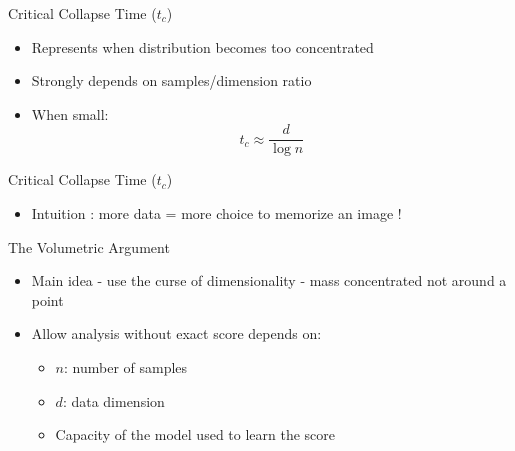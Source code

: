 \documentclass[aspectratio=169]{beamer}
\begin{document}
\begin{frame}{Critical Collapse Time ($t_c$)}
    \begin{itemize}

        \item Represents when distribution becomes too concentrated
        \item Strongly depends on samples/dimension ratio
        \item When small:
        \begin{equation}
            t_c \approx \frac{d}{\log n}
        \end{equation}
    \end{itemize}
    
    \begin{center}
    \end{center}
\end{frame}



\begin{frame}{Critical Collapse Time ($t_c$)}
\begin{itemize}
    \item Intuition : more data = more choice to memorize an image !
\end{itemize}
\begin{center}
    \end{center}
\end{frame}


\begin{frame}{The Volumetric Argument}
    \begin{itemize}
        \item Main idea - use the curse of dimensionality - mass concentrated not around a point
    
        \item Allow analysis without exact score depends on:
        \begin{itemize}
            \item $n$: number of samples
            \item $d$: data dimension
            \item Capacity of the model used to learn the score
        \end{itemize}
    \end{itemize}
\end{frame}
\end{document}
